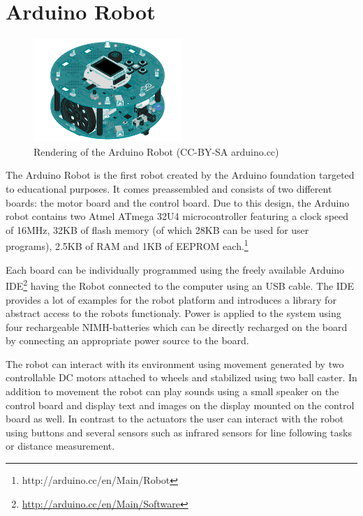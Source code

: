 \section{Arduino Robot}
\begin{figure}[H]
  \centering
  \includegraphics[width=0.5\textwidth]{images/arduinorobot.jpg}
  \caption{Rendering of the Arduino Robot (CC-BY-SA arduino.cc)}
\end{figure}

The Arduino Robot is the first robot created by the Arduino foundation targeted to educational purposes. It comes preassembled and consists of two different boards: the motor board and the control board. Due to this design, the Arduino robot contains two Atmel ATmega 32U4 microcontroller featuring a clock speed of 16MHz, 32KB of flash memory (of which 28KB can be used for user programs), 2.5KB of RAM and 1KB of EEPROM each.\footnote{{http://arduino.cc/en/Main/Robot}}

Each board can be individually programmed using the freely available Arduino IDE\footnote{\url{http://arduino.cc/en/Main/Software}} having the Robot connected to the computer using an USB cable. The IDE provides a lot of examples for the robot platform and introduces a library for abstract access to the robots functionaly. Power is applied to the system using four rechargeable NIMH-batteries which can be directly recharged on the board by connecting an appropriate power source to the board.

The robot can interact with its environment using movement generated by two controllable DC motors attached to wheels and stabilized using two ball caster. In addition to movement the robot can play sounds using a small speaker on the control board and display text and images on the display mounted on the control board as well. In contrast to the actuators the user can interact with the robot using buttons and several sensors such as infrared sensors for line following tasks or distance measurement.

